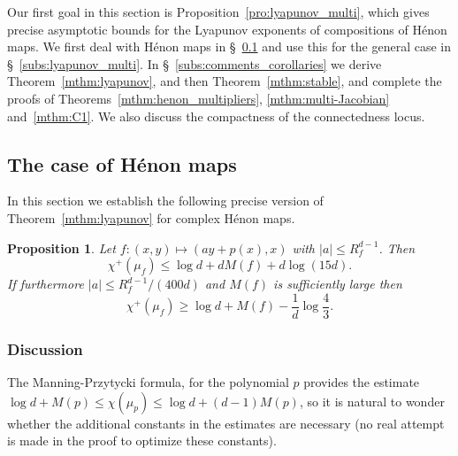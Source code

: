 \documentclass[oneside, 12pt]{amsart}
\newcommand{\abs}[1]{\left\vert#1\right\vert}
\newcommand{\unsur}[1]{\frac{1}{#1}}
\theoremstyle{plain}
\newtheorem{pro}[thm]{Proposition}
\theoremstyle{definition}
\numberwithin{equation}{section}       %
\numberwithin{equation}{section}       %
\begin{document}
Our first goal in this section is 
  Proposition~\ref{pro:lyapunov_multi}, which gives 
precise asymptotic bounds for the Lyapunov exponents of compositions of Hénon maps.
We  first deal with  Hénon maps in \S~\ref{subs:lyapunov_henon} 
and use this for the general case in  \S~\ref{subs:lyapunov_multi}. 
 In \S~\ref{subs:comments_corollaries} we derive Theorem~\ref{mthm:lyapunov}, and then 
 Theorem~\ref{mthm:stable}, and complete the proofs of  Theorems~\ref{mthm:henon_multipliers}, \ref{mthm:multi-Jacobian} and~\ref{mthm:C1}. We also 
 discuss the compactness of the connectedness locus.


\subsection{The case of  Hénon maps}\label{subs:lyapunov_henon}


In this section we establish    the following precise version of 
Theorem~\ref{mthm:lyapunov} for complex Hénon maps.   

\begin{pro}\label{pro:lyapunov_henon} 
Let $f\colon (x,y)\mapsto (ay+p(x), x)$ with   $\abs{a}\leq     R_f^{d-1}$. Then 
\begin{equation}\label{eq:lyap_estimate_sup}
\chi^+(\mu_f)\leq  \log d +  d    M(f)  + d \log(15d).
 \end{equation}
If furthermore $\abs{a}\leq     R_f^{d-1}/(400d)$ and $M(f)$ is   sufficiently large then 
\begin{equation}\label{eq:lyap_estimate_inf}
  \chi^+(\mu_f)\geq     \log d +M(f) - \unsur{d} \log\frac43.
 \end{equation}
\end{pro}

 \subsubsection{Discussion}\label{subsub:comments}
The Manning-Przytycki formula, for the polynomial $p$ provides the estimate $\log d+M(p)\leq \chi(\mu_p)\leq \log d + (d-1)M(p)$, 
so it is natural to wonder whether the additional constants in the estimates are necessary 
(no real attempt  is made in the proof  to    optimize these  constants). 
\end{document}
